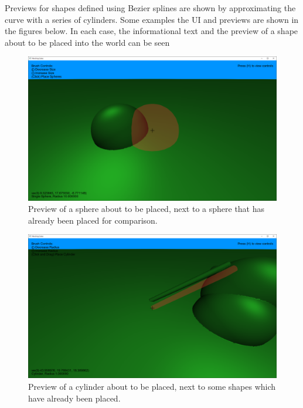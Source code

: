 \documentclass{article}
\begin{document}
Previews for shapes defined using Bezier splines are shown by approximating the curve with a series of cylinders. Some examples the UI and previews are shown in the figures below. In each case, the informational text and the preview of a shape about to be placed into the world can be seen
\begin{figure}[H]
  \includegraphics[width=\textwidth]{sphere_preview.png}
  \caption{Preview of a sphere about to be placed, next to a sphere that has already been placed for comparison.}
  \label{fig:sphere_preview}
\end{figure}
\begin{figure}[H]
  \includegraphics[width=\textwidth]{cylinder_preview.png}
  \caption{Preview of a cylinder about to be placed, next to some shapes which have already been placed.}
  \label{fig:cylinder_preview}
\end{figure}
\end{document}
